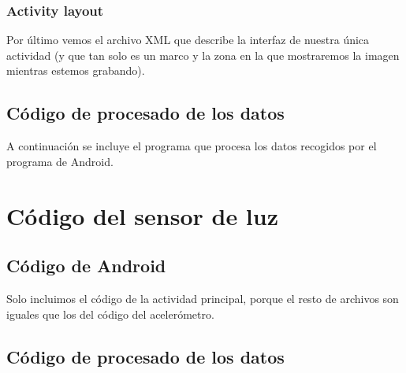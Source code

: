 \documentclass[a4paper,openright, 12pt]{book}
\begin{document}
\subsection{Activity layout}
Por último vemos el archivo XML que describe la interfaz de nuestra única actividad (y que tan solo es un marco y la zona en la que mostraremos la imagen mientras estemos grabando).


\newpage
\section{Código de procesado de los datos} \label{ap_acc}
A continuación se incluye el programa que procesa los datos recogidos por el programa de Android.

\newpage


\chapter{Código del sensor de luz} 
\section{Código de Android} \label{android_ap_illu}
Solo incluimos el código de la actividad principal, porque el resto de archivos son iguales que los del código del acelerómetro.

\newpage
\section{Código de procesado de los datos} \label{ap_illu}

\newpage


\cleardoublepage
{}
\nocite{*}
\end{document}
